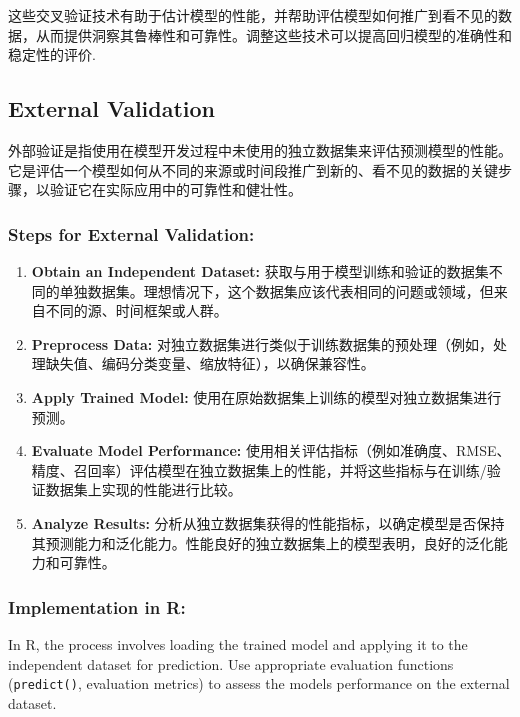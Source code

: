 \documentclass[
]{article}
\begin{document}
这些交叉验证技术有助于估计模型的性能，并帮助评估模型如何推广到看不见的数据，从而提供洞察其鲁棒性和可靠性。调整这些技术可以提高回归模型的准确性和稳定性的评价.

\hypertarget{external-validation}{%
\subsection{External Validation}\label{external-validation}}

外部验证是指使用在模型开发过程中未使用的独立数据集来评估预测模型的性能。它是评估一个模型如何从不同的来源或时间段推广到新的、看不见的数据的关键步骤，以验证它在实际应用中的可靠性和健壮性。

\hypertarget{steps-for-external-validation}{%
\subsubsection{Steps for External
Validation:}\label{steps-for-external-validation}}

\begin{enumerate}
\def\labelenumi{\arabic{enumi}.}
\item
  \textbf{Obtain an Independent Dataset:}
  获取与用于模型训练和验证的数据集不同的单独数据集。理想情况下，这个数据集应该代表相同的问题或领域，但来自不同的源、时间框架或人群。
\item
  \textbf{Preprocess Data:}
  对独立数据集进行类似于训练数据集的预处理（例如，处理缺失值、编码分类变量、缩放特征），以确保兼容性。
\item
  \textbf{Apply Trained Model:}
  使用在原始数据集上训练的模型对独立数据集进行预测。
\item
  \textbf{Evaluate Model Performance:}
  使用相关评估指标（例如准确度、RMSE、精度、召回率）评估模型在独立数据集上的性能，并将这些指标与在训练/验证数据集上实现的性能进行比较。
\item
  \textbf{Analyze Results:}
  分析从独立数据集获得的性能指标，以确定模型是否保持其预测能力和泛化能力。性能良好的独立数据集上的模型表明，良好的泛化能力和可靠性。
\end{enumerate}

\hypertarget{implementation-in-r-2}{%
\subsubsection{Implementation in R:}\label{implementation-in-r-2}}

In R, the process involves loading the trained model and applying it to
the independent dataset for prediction. Use appropriate evaluation
functions (\texttt{predict()}, evaluation metrics) to assess the
model\textquotesingle s performance on the external dataset.
\end{document}
